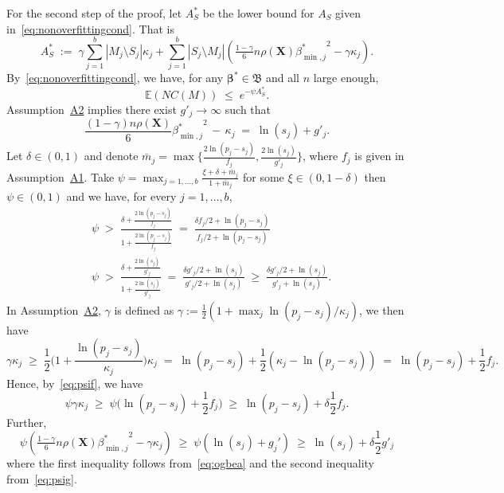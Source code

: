 \documentclass[
  12pt]{article}
\newcommand{\E}{\mathbb{E}}
\newcommand{\bbeta}{\boldsymbol{\beta}}
\newcommand{\bX}{\mathbf{X}}
\newcommand{\bB}{\mathfrak{B}}
\begin{document}
For the second step of the proof, let $A_S^*$ be the lower bound for $A_S$ given in~\eqref{eq:nonoverfittingcond}. That is 
$$A_S^*\;:=\;\gamma\sum_{j=1}^b|M_j \setminus S_j|\kappa_j + \sum_{j=1}^b |S_j\setminus M_j |\left(\tfrac{1-\gamma}{6} n \rho(\bX) {\beta^*_{\min,j}}^{2} - \gamma\kappa_j\right).$$
By~\eqref{eq:nonoverfittingcond}, we have, for any $\bbeta^*\in \bB$ and all $n$ large enough,
\begin{equation}\label{eq:boundexp}
    \E(NC(M))\;\leq\;e^{-\psi A_S^*}.
\end{equation}
Assumption~\hyperlink{lab:A2}{A2} implies there exist $g'_j \to \infty$ such that
\begin{equation}\label{eq:ogbea}
    \frac{(1-\gamma) n\rho(\bX)}{6}{\beta_{\min,j}^*}^2 \,- \,\kappa_j \;=\; \ln(s_j) + g'_{j}.
\end{equation}
Let $\delta \in (0,1)$ and denote $\bar{m}_j=\max\big\{\frac{2\ln(p_j-s_j)}{f_j},\frac{2\ln(s_j)}{g'_{j}}\big\}$, where $f_j$ is given in Assumption~\hyperlink{lab:A1}{A1}. 
Take $\psi=\max_{j=1,\ldots,b}\frac{\xi + \delta + \bar{m}_j}{1+\bar{m}_j}$ for some $\xi \in(0, 1- \delta)$ then $\psi \in (0,1)$ and we have, for every $j=1,\ldots,b$,
\begin{align}
    &\psi \;>\; \frac{\delta + \frac{2\ln(p_j-s_j)}{f_j}}{1+\frac{2\ln(p_j-s_j)}{f_j}} \;=\; \frac{\delta f_j/2 + \ln(p_j-s_j)}{f_j/2 +\ln(p_j-s_j)} \label{eq:psif}\\
    &\psi \;>\; \frac{\delta + \frac{2\ln(s_j)}{g'_j}}{1+\frac{2\ln(s_j)}{g'_j}} \;=\;  \frac{\delta g'_j/2 + \ln(s_j)}{g'_j/2 +\ln(s_j)} \;\geq\; \frac{\delta g'_j/2 + \ln(s_j)}{g'_j +\ln(s_j)}.\label{eq:psig}
\end{align}
In Assumption~\hyperlink{lab:A2}{A2}, $\gamma$ is defined as $\gamma:=\tfrac12(1+\max_j\ln(p_j-s_j)/\kappa_j)$, we then have 
$$
\gamma\kappa_j\;\geq\;\frac12 \Big(1+\frac{\ln(p_j-s_j)}{\kappa_j}\Big)\kappa_j\;=\;\ln(p_j-s_j)+\frac12(\kappa_j-\ln(p_j-s_j)) \;=\; \ln(p_j-s_j)+ \frac12f_j.
$$
Hence, by~\eqref{eq:psif}, we have
\begin{equation}\label{eq:ooofjfj}
\psi\gamma\kappa_j \;\geq\; \psi\big(\ln(p_j-s_j)+ \frac12f_j\big) \;\geq\;  \ln(p_j-s_j)+ \delta\frac12f_j.
\end{equation}
Further,
\begin{equation}\label{eq:ooofjfj2}
\psi\left(\tfrac{1-\gamma}{6} n \rho(\bX) {\beta^*_{\min,j}}^{2} - \gamma\kappa_j\right) \;\geq\; \psi\left(\ln(s_j)+g_j'\right) \;\geq\; \ln(s_j)+\delta \frac{1}{2}g'_j
\end{equation}
where the first inequality follows from~\eqref{eq:ogbea} and the second inequality from~\eqref{eq:psig}.
\end{document}
